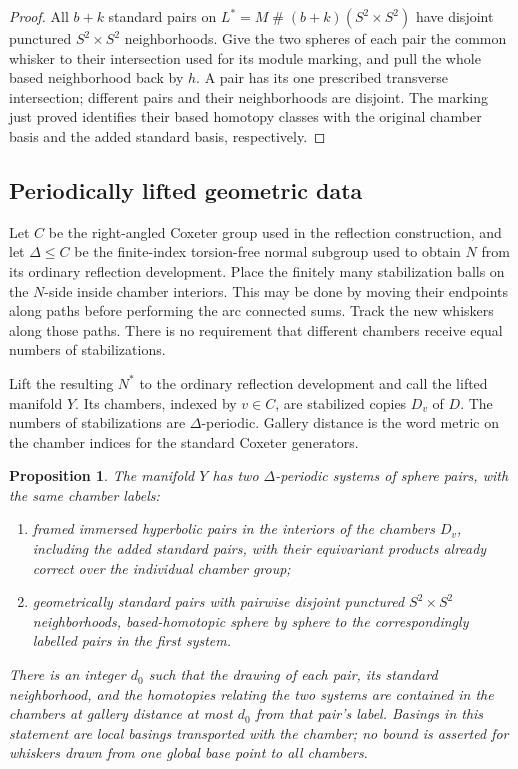 \documentclass[11pt]{article}
\newtheorem{proposition}[theorem]{Proposition}
\theoremstyle{definition}
\theoremstyle{remark}
\begin{document}
\begin{proof}
All $b+k$ standard pairs on
$L^*=M\mathbin{\#}(b+k)(S^2\times S^2)$ have disjoint punctured
$S^2\times S^2$ neighborhoods.  Give the two spheres of each pair
the common whisker to their intersection used for its module marking,
and pull the whole based neighborhood back by $h$.  A pair has
its one prescribed transverse intersection; different pairs and their
neighborhoods are disjoint.  The marking just proved identifies their
based homotopy classes with the original chamber basis and the added
standard basis, respectively.
\end{proof}

\subsection{Periodically lifted geometric data}

Let $C$ be the right-angled Coxeter group used in the reflection
construction, and let $\Delta\le C$ be the finite-index torsion-free
normal subgroup used to obtain $N$ from its ordinary reflection
development.  Place the finitely many stabilization balls on the
$N$-side inside chamber interiors.  This may be done by moving their
endpoints along paths before performing the arc connected sums.
Track the new whiskers along those paths.  There is no requirement that
different chambers receive equal numbers of stabilizations.

Lift the resulting $N^*$ to the ordinary reflection development and
call the lifted manifold $Y$.  Its chambers, indexed by $v\in C$, are
stabilized copies $D_v$ of $D$.  The numbers of stabilizations are
$\Delta$-periodic.  Gallery distance is the word metric on the chamber
indices for the standard Coxeter generators.

\begin{proposition}\label{st:periodic-data}
The manifold $Y$ has two $\Delta$-periodic systems of sphere pairs,
with the same chamber labels:
\begin{enumerate}
\item framed immersed hyperbolic pairs in the interiors of the
chambers $D_v$, including the added standard pairs, with their
equivariant products already correct over the individual chamber group;
\item geometrically standard pairs with pairwise disjoint punctured
$S^2\times S^2$ neighborhoods, based-homotopic sphere by sphere to
the correspondingly labelled pairs in the first system.
\end{enumerate}
There is an integer $d_0$ such that the drawing of each pair, its
standard neighborhood, and the homotopies relating the two systems
are contained in the chambers at gallery distance at most $d_0$ from
that pair's label.  Basings in this statement are local basings
transported with the chamber; no bound is asserted for whiskers drawn
from one global base point to all chambers.
\end{proposition}
\end{document}
